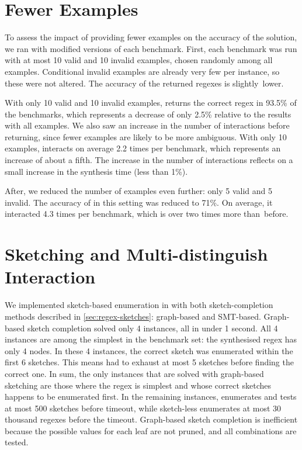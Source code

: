 \FloatBarrier
\section{Fewer Examples} \label{sec:fewer-exs}

To assess the impact of providing fewer examples on the accuracy of the solution, we ran \Forest{} with modified versions of each benchmark.
First, each benchmark was run with at most 10 valid and 10 invalid examples, chosen randomly among all examples. Conditional invalid examples are already very few per instance, so these were not altered. The accuracy of the returned regexes is slightly~lower.

With only 10 valid and 10 invalid examples, \Forest{} returns the correct regex in 93.5\% of the benchmarks, which represents a decrease of only 2.5\% relative to the results with all examples.
We also saw an increase in the number of interactions before returning, since fewer examples are likely to be more ambiguous. With only 10 examples, \Forest{} interacts on average 2.2 times per benchmark, which represents an increase of about a fifth.
The increase in the number of interactions reflects on a small increase in the synthesis time (less than 1\%).

After, we reduced the number of examples even further: only 5 valid and 5 invalid. The accuracy of \Forest{} in this setting was reduced to 71\%. On average, it interacted 4.3 times per benchmark, which is over two times more than~before.


\section{Sketching and Multi-distinguish Interaction}
\label{sec:res-sketching-interaction}

We implemented sketch-based enumeration in \Forest with both sketch-completion methods described in \autoref{sec:regex-sketches}: graph-based and \ac{SMT}-based.
%
Graph-based sketch completion solved only 4 instances, all in under 1 second. All 4 instances are among the simplest in the benchmark set: the synthesised regex has only 4 nodes. In these 4 instances, the correct sketch was enumerated within the first 6 sketches. This means \Forest had to exhaust at most 5 sketches before finding the correct one. In sum, the only instances that are solved with graph-based sketching are those where the regex is simplest and whose correct sketches happens to be enumerated first. In the remaining instances, \Forest enumerates and tests at most 500 sketches before timeout, while sketch-less \Forest enumerates at most 30 thousand regexes before the timeout. Graph-based sketch completion is inefficient because the possible values for each leaf are not pruned, and all combinations are tested.

